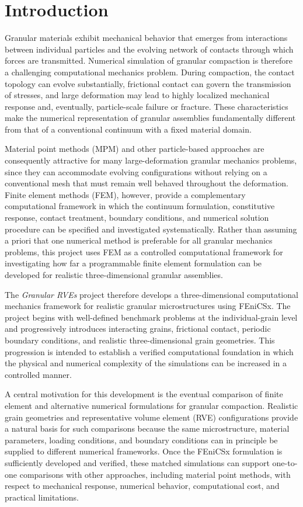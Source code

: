 \section{Introduction}

Granular materials exhibit mechanical behavior that emerges from interactions between individual particles and the evolving network of contacts through which forces are transmitted. 
Numerical simulation of granular compaction is therefore a challenging computational mechanics problem. 
During compaction, the contact topology can evolve substantially, frictional contact can govern the transmission of stresses, and large deformation may lead to highly localized mechanical response and, eventually, particle-scale failure or fracture. 
These characteristics make the numerical representation of granular assemblies fundamentally different from that of a conventional continuum with a fixed material domain.

Material point methods (MPM) and other particle-based approaches are consequently attractive for many large-deformation granular mechanics problems, since they can accommodate evolving configurations without relying on a conventional mesh that must remain well behaved throughout the deformation. 
Finite element methods (FEM), however, provide a complementary computational framework in which the continuum formulation, constitutive response, contact treatment, boundary conditions, and numerical solution procedure can be specified and investigated systematically. 
Rather than assuming a priori that one numerical method is preferable for all granular mechanics problems, this project uses FEM as a controlled computational framework for investigating how far a programmable finite element formulation can be developed for realistic three-dimensional granular assemblies.

The \textit{Granular RVEs} project therefore develops a three-dimensional computational mechanics framework for realistic granular microstructures using FEniCSx. 
The project begins with well-defined benchmark problems at the individual-grain level and progressively introduces interacting grains, frictional contact, periodic boundary conditions, and realistic three-dimensional grain geometries. 
This progression is intended to establish a verified computational foundation in which the physical and numerical complexity of the simulations can be increased in a controlled manner.

A central motivation for this development is the eventual comparison of finite element and alternative numerical formulations for granular compaction. 
Realistic grain geometries and representative volume element (RVE) configurations provide a natural basis for such comparisons because the same microstructure, material parameters, loading conditions, and boundary conditions can in principle be supplied to different numerical frameworks. 
Once the FEniCSx formulation is sufficiently developed and verified, these matched simulations can support one-to-one comparisons with other approaches, including material point methods, with respect to mechanical response, numerical behavior, computational cost, and practical limitations.

